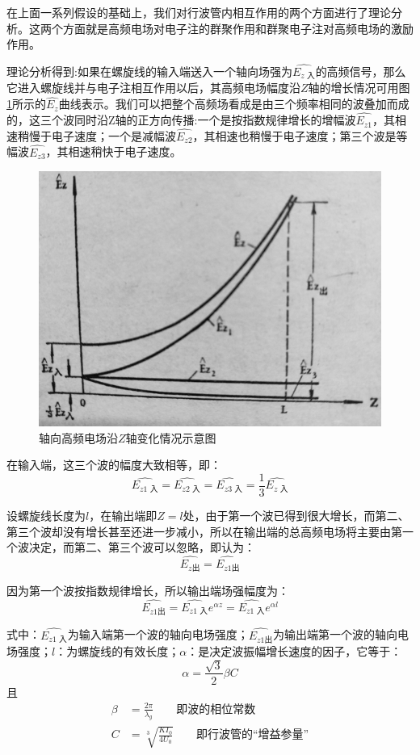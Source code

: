 在上面一系列假设的基础上，我们对行波管内相互作用的两个方面进行了理论分析。这两个方面就是高频电场对电子注的群聚作用和群聚电子注对高频电场的激励作用。


理论分析得到:如果在螺旋线的输入端送入一个轴向场强为$ \hat{E_{z\textrm{ 入}}} $的高频信号，那么它进入螺旋线并与电子注相互作用以后，其高频电场幅度沿$ Z $轴的增长情况可用图\ref{ch4-3}所示的$ \hat{E_z} $曲线表示。我们可以把整个高频场看成是由三个频率相同的波叠加而成的，这三个波同时沿Z轴的正方向传播:一个是按指数规律增长的增幅波$ \hat{E_{z1}} $，其相速稍慢于电子速度；一个是减幅波$ \hat{E_{z2}} $，其相速也稍慢于电子速度；第三个波是等幅波$ \hat{E_{z3}} $，其相速稍快于电子速度。
\begin{figure}[phtb]
	\centering
	\includegraphics[width=0.55\linewidth]{figure/ch4-3}
	\caption{轴向高频电场沿$ Z $轴变化情况示意图}
	\label{ch4-3}
\end{figure}

在输入端，这三个波的幅度大致相等，即：
\begin{equation} \label{eq:4-5}
	\hat{E_{z1\textrm{ 入}}} = \hat{E_{z2\textrm{ 入}}} = \hat{E_{z3\textrm{ 入}}} = \frac{1}{3}\hat{E_{z\textrm{ 入}}}
\end{equation}

设螺旋线长度为$ l $，在输出端即$ Z = l $处，由于第一个波已得到很大增长，而第二、第三个波却没有增长甚至还进一步减小，所以在输出端的总高频电场将主要由第一个波决定，而第二、第三个波可以忽略，即认为：
\begin{equation} \label{eq:4-6}
	\hat{E_{z\textrm{出}}} = \hat{E_{z1\textrm{出}}}
\end{equation}


因为第一个波按指数规律增长，所以输出端场强幅度为：
\begin{equation} \label{eq:4-7}
	\hat{E_{z1\textrm{出}}} = \hat{E_{z1\textrm{ 入}}}e^{\alpha z} = \hat{E_{z1\textrm{ 入}}}e^{\alpha l}
\end{equation}

式中：$ \hat{E_{z1\textrm{ 入}}} $为输入端第一个波的轴向电场强度；$ \hat{E_{z1\textrm{出}}} $为输出端第一个波的轴向电场强度；$ l $：为螺旋线的有效长度；$ \alpha $：是决定波振幅增长速度的因子，它等于：
\begin{equation} \label{eq:4-8}
	\alpha = \frac{\sqrt{3}}{2}\beta C
\end{equation}
且
\begin{equation*} 
	\begin{aligned}
	\beta &= \frac{2\pi}{\lambda_g}\qquad \text{即波的相位常数}\\ C &= \sqrt[3]{\frac{KI_0}{4U_0}}\qquad \text{即行波管的“增益参量”}
	\end{aligned}
\end{equation*}

